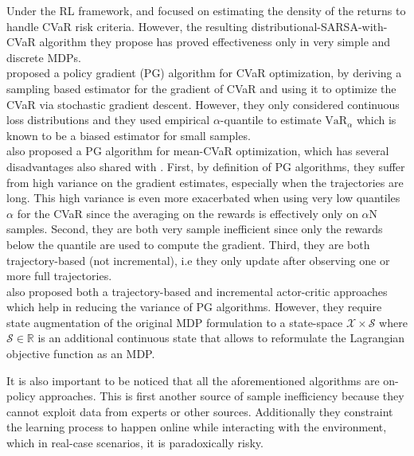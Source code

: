 Under the RL framework, \citet{Morimura2010a} and \citet{Morimura2010b}
focused on estimating the density of the returns
to handle CVaR risk criteria. However, the resulting distributional-SARSA-with-CVaR algorithm
they propose has  proved  effectiveness  only  in  very  simple  and discrete MDPs.\\
\citet{Tamar2015a} proposed a policy gradient (PG) algorithm for CVaR optimization, by
deriving a sampling based estimator for the gradient of CVaR and using it to optimize the
CVaR via stochastic gradient descent. However, they only considered continuous loss distributions
and they used empirical $\alpha$-quantile to estimate 
$\text{VaR}_\alpha$ which is known to be a biased estimator for small samples.\\
\citet{Chow2014} also proposed a PG algorithm for mean-CVaR optimization, which has several
disadvantages also shared with \citet{Tamar2015}. First, by definition of PG algorithms,
they suffer from high variance on the gradient estimates, especially when the trajectories
are long. This high variance is even more exacerbated when using very low quantiles $\alpha$ for the CVaR 
since the averaging on the rewards is effectively only on $\alpha$N samples.
Second, they are both very sample inefficient since only the rewards below the quantile
are used to compute the gradient. Third, they are both trajectory-based (not incremental), 
i.e they only update after observing one or more full trajectories.\\
\citet{Chow2014} also proposed both a trajectory-based and incremental actor-critic
approaches which help in reducing the variance of PG algorithms. However, they require
state augmentation of the original MDP formulation to a state-space
$\mathcal{X} \times \mathcal{S}$ where $\mathcal{S} \in \mathbb R$ is an additional continuous
state that allows to reformulate the Lagrangian objective function as an MDP.

It is also important to be noticed that all the aforementioned algorithms are on-policy approaches.
This is first another source of sample inefficiency
because they cannot exploit data from experts or other sources. Additionally they
constraint the learning process to happen online while interacting with the environment,
which in real-case scenarios, it is paradoxically risky.

